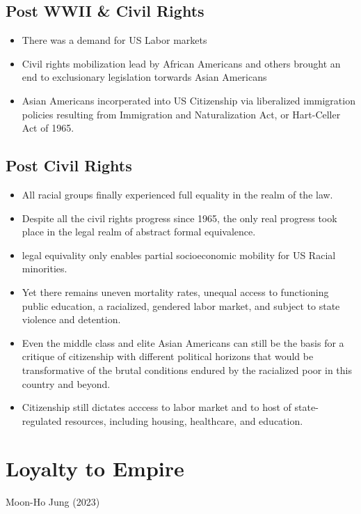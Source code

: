 \documentclass{article}
\begin{document}
\subsection{Post WWII \& Civil Rights}
\begin{itemize}
  \item There was a demand for US Labor markets
  \item Civil rights mobilization lead by African Americans
    and others brought an end to exclusionary legislation
    torwards Asian Americans
  \item Asian Americans incorperated into US Citizenship via
    liberalized immigration policies resulting from
    Immigration and Naturalization Act, or Hart-Celler Act of 1965.
\end{itemize}
\subsection{Post Civil Rights}
\begin{itemize}
  \item All racial groups finally experienced
    full equality in the realm of the law.
  \item Despite all the civil rights progress since 1965,
    the only real progress took place in the
    legal realm of abstract formal equivalence.
  \item legal equivality only enables partial
    socioeconomic mobility for US Racial minorities.
  \item Yet there remains uneven mortality rates,
    unequal access to functioning public education,
    a racialized, gendered labor market, and subject to
    state violence and detention.
  \item Even the middle class and elite Asian Americans
    can still be the basis for a critique of
    citizenship with different political horizons that would be
    transformative of the brutal conditions endured by the
    racialized poor in this country and beyond.
  \item Citizenship still dictates acccess to labor market
    and to host of state-regulated resources,
    including housing, healthcare, and education.
\end{itemize}


\pagebreak

\section{Loyalty to Empire}
Moon-Ho Jung (2023)
\end{document}
